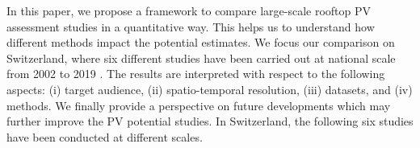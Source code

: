 In this paper, we propose a framework to compare large-scale rooftop PV assessment studies in a quantitative way. This helps us to understand how different methods impact the potential estimates. We focus our comparison on Switzerland, where six different studies have been carried out at national scale from 2002 to 2019 \cite{iea_potential_2002,assouline_quantifying_2017,assouline_large-scale_2018,klauser_solarpotentialanalyse_2016,buffat_scalable_2018, walch_big_2020}. The results are interpreted with respect to the following aspects: (i) target audience, (ii) spatio-temporal resolution, (iii) datasets, and (iv) methods. We finally provide a perspective on future developments which may further improve the PV potential studies. In Switzerland, the following six studies have been conducted at different scales. 

